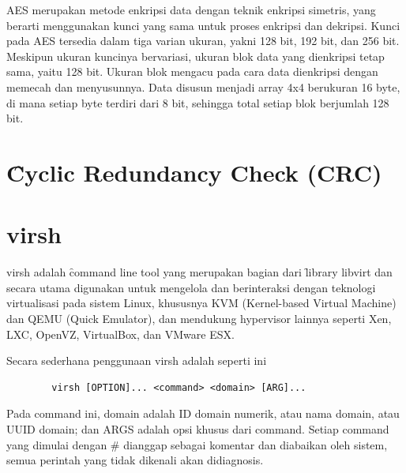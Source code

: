 AES merupakan metode enkripsi data dengan teknik enkripsi simetris, yang berarti menggunakan kunci yang sama untuk proses enkripsi dan dekripsi. Kunci pada AES tersedia dalam tiga varian ukuran, yakni 128 bit, 192 bit, dan 256 bit. Meskipun ukuran kuncinya bervariasi, ukuran blok data yang dienkripsi tetap sama, yaitu 128 bit. Ukuran blok mengacu pada cara data dienkripsi dengan memecah dan menyusunnya. Data disusun menjadi array 4x4 berukuran 16 byte, di mana setiap byte terdiri dari 8 bit, sehingga total setiap blok berjumlah 128 bit\cite{NistAes}.





\section{\f{Cyclic Redundancy Check} (CRC)}


\section{virsh}

virsh adalah \f{command line tool} yang merupakan bagian dari \f{library} libvirt dan secara utama digunakan untuk mengelola dan berinteraksi dengan teknologi virtualisasi pada sistem Linux, khususnya KVM (Kernel-based Virtual Machine) dan QEMU (Quick Emulator), dan mendukung hypervisor lainnya seperti Xen, LXC, OpenVZ, VirtualBox, dan VMware ESX\cite{libvirtLibvirtVirsh}.

Secara sederhana penggunaan virsh adalah seperti ini
\begin{center}
	\begin{verbatim}
		virsh [OPTION]... <command> <domain> [ARG]...
	\end{verbatim}
\end{center}

Pada command ini, domain adalah ID domain numerik, atau nama domain, atau UUID domain; dan ARGS adalah opsi khusus dari command. Setiap command yang dimulai dengan \# dianggap sebagai komentar dan diabaikan oleh sistem, semua perintah yang tidak dikenali akan didiagnosis.

